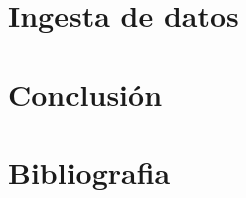 \documentclass[12pt]{article}
\begin{document}
\clearpage

\section{Ingesta de datos}



\clearpage

\section{Conclusión}


\clearpage

\section{Bibliografia}

\cite{Botpress}

\printbibliography
\end{document}
